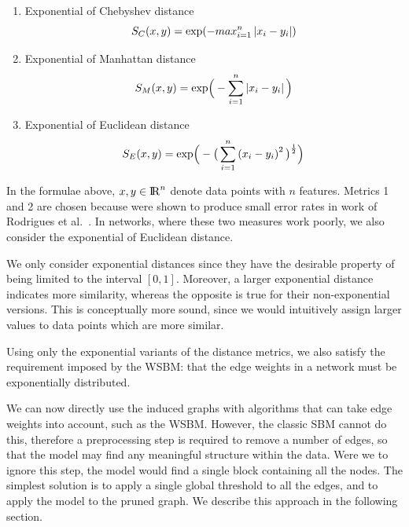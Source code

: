 \documentclass[conference]{IEEEtran}
\begin{document}
\begin{enumerate}
    \item Exponential of Chebyshev distance
    $$ S_C(x,y) = {\textnormal{exp}( - max_{i = 1}^n \left | x_i - y_i \right | )} $$

    \item Exponential of Manhattan distance
    $$ S_M(x,y) = \textnormal{exp} \Big ( -\sum_{i=1}^{n} \left | x_i - y_i \right | \Big)$$

    \item Exponential of Euclidean distance
    $$ S_E(x,y) = \textnormal{exp} \Big ( - \big ( \sum_{i=1}^{n} \left ( x_i - y_i \right ) ^2 \big ) ^{\frac{1}{2}} \Big) $$

\end{enumerate}

In the formulae above, $x, y \in {\rm I\!R}^n$ denote data points with $n$ features. Metrics 1 and 2 are chosen because were shown to produce small error rates in work of Rodrigues et al.~\cite{rodrigues2011complex}. In networks, where these two measures work poorly, we also consider the exponential of Euclidean distance.

We only consider exponential distances since they have the desirable property of being limited to the interval $\left [ 0, 1 \right ]$. Moreover, a larger exponential distance indicates more similarity, whereas the opposite is true for their non-exponential versions. This is conceptually more sound, since we would intuitively assign larger values to data points which are more similar.

Using only the exponential variants of the distance metrics, we also satisfy the requirement imposed by the WSBM: that the edge weights in a network must be exponentially distributed.

We can now directly use the induced graphs with algorithms that can take edge weights into account, such as the WSBM. However, the classic SBM cannot do this, therefore a preprocessing step is required to remove a number of edges, so that the model may find any meaningful structure within the data. Were we to ignore this step, the model would find a single block containing all the nodes. The simplest solution is to apply a single global threshold to all the edges, and to apply the model to the pruned graph. We describe this approach in the following section.
\end{document}
